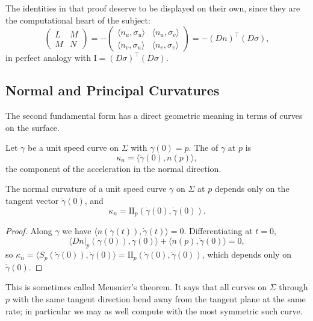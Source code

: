 The identities in that proof deserve to be displayed on their own, since they are the computational heart of the subject:
$$
\begin{pmatrix} L & M \\ M & N\end{pmatrix} = -\begin{pmatrix} \langle n_u, \sigma_u\rangle & \langle n_u, \sigma_v\rangle \\ \langle n_v, \sigma_u \rangle & \langle n_v, \sigma_v\rangle\end{pmatrix} = -(Dn)^\top (D\sigma),
$$
in perfect analogy with $\mathrm{I} = (D\sigma)^\top(D\sigma)$.

\subsection{Normal and Principal Curvatures}

The second fundamental form has a direct geometric meaning in terms of curves on the surface.

\begin{definition}
    Let $\gamma$ be a unit speed curve on $\Sigma$ with $\gamma(0) = p$. The  of $\gamma$ at $p$ is
    $$
    \kappa_n = \langle \ddot\gamma(0), n(p)\rangle,
    $$
    the component of the acceleration in the normal direction.
\end{definition}

\begin{proposition}
    The normal curvature of a unit speed curve $\gamma$ on $\Sigma$ at $p$ depends only on the tangent vector $\dot\gamma(0)$, and
    $$
    \kappa_n = \mathrm{II}_p(\dot\gamma(0), \dot\gamma(0)).
    $$
\end{proposition}
\begin{proof}
    Along $\gamma$ we have $\langle n(\gamma(t)), \dot\gamma(t)\rangle = 0$. Differentiating at $t = 0$,
    $$
    \langle \left.Dn\right|_p(\dot\gamma(0)), \dot\gamma(0)\rangle + \langle n(p), \ddot\gamma(0)\rangle = 0,
    $$
    so $\kappa_n = \langle S_p(\dot\gamma(0)), \dot\gamma(0)\rangle = \mathrm{II}_p(\dot\gamma(0), \dot\gamma(0))$, which depends only on $\dot\gamma(0)$.
\end{proof}

This is sometimes called Meusnier's theorem. It says that all curves on $\Sigma$ through $p$ with the same tangent direction bend away from the tangent plane at the same rate; in particular we may as well compute with the most symmetric such curve.

